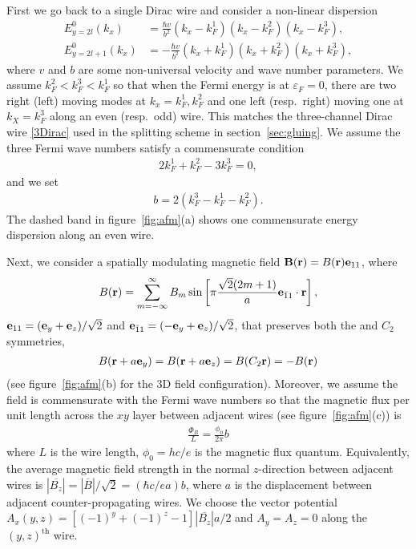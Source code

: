 First we go back to a single Dirac wire and consider a non-linear dispersion \begin{align}E^0_{y=2l}(k_x)&=\frac{\hbar v}{b^2}(k_x-k_F^1)(k_x-k_F^2)(k_x-k_F^3),\nonumber\\E^0_{y=2l+1}(k_x)&=-\frac{\hbar v}{b^2}(k_x+k_F^1)(k_x+k_F^2)(k_x+k_F^3),\end{align} where $v$ and $b$ are some non-universal velocity and wave number parameters. We assume $k_F^2<k_F^3<k_F^1$ so that when the Fermi energy is at $\varepsilon_F=0$, there are two right (left) moving modes at $k_x=k_F^1,k_F^2$ and one left (resp.~right) moving one at $k_X=k_F^3$ along an even (resp.~odd) wire. This matches the three-channel Dirac wire \eqref{3Dirac} used in the splitting scheme in section~\ref{sec:gluing}. We assume the three Fermi wave numbers satisfy a commensurate condition \begin{align}2k_F^1+k_F^2-3k_F^3=0,\label{kcomm}\end{align} and we set \begin{align}b=2(k_F^3-k_F^1-k_F^2).\label{bcomm1}\end{align} The dashed band in figure~\ref{fig:afm}(a) shows one commensurate energy dispersion along an even wire.

Next, we consider a spatially modulating magnetic field ${\bf B}({\bf r})=B({\bf r}){\bf e}_{11}$, where \begin{align}B({\bf r})=\sum_{m=-\infty}^\infty B_m\sin\left[\pi\frac{\sqrt{2}(2m+1)}{a}{\bf e}_{\bar{1}1}\cdot{\bf r}\right],\end{align} ${\bf e}_{11}=({\bf e}_y+{\bf e}_z)/\sqrt{2}$ and ${\bf e}_{\bar{1}1}=(-{\bf e}_y+{\bf e}_z)/\sqrt{2}$, that preserves both the \AFTR and $C_2$ symmetries, \begin{align}B({\bf r}+a{\bf e}_y)=B({\bf r}+a{\bf e}_z)=B(C_2{\bf r})=-B({\bf r})\end{align} (see figure~\ref{fig:afm}(b) for the 3D field configuration). Moreover, we assume the field is commensurate with the Fermi wave numbers so that the magnetic flux per unit length across the $xy$ layer between adjacent wires (see figure~\ref{fig:afm}(c)) is \begin{align}\frac{\Phi_B}{L}=\frac{\phi_0}{2\pi}b\label{bcomm2}\end{align} where $L$ is the wire length, $\phi_0=hc/e$ is the magnetic flux quantum. Equivalently, the average magnetic field strength in the normal $z$-direction between adjacent wires is $|\overline{B_z}|=|\overline{B}|/\sqrt{2}=(\hbar c/ea)b$, where $a$ is the displacement between adjacent counter-propagating wires. We choose the vector potential $A_x(y,z)=[(-1)^y+(-1)^z-1]|\overline{B_z}|a/2$ and $A_y=A_z=0$ along the $(y,z)^{\mathrm{th}}$ wire. 


